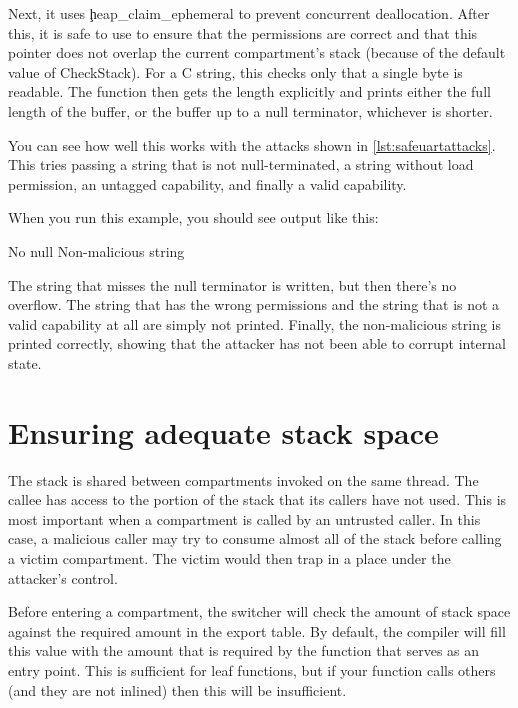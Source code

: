 \codelisting[marker=safe_uart,caption=Checks to ensure that a function does not crash.,label=lst:safeuartchecks, filename=examples/check_arguments/uart.cc]{}

Next, it uses \c{heap_claim_ephemeral} to prevent concurrent deallocation.
After this, it is safe to use  to ensure that the permissions are correct and that this pointer does not overlap the current compartment's stack (because of the default value of CheckStack).
For a C string, this checks only that a single byte is readable.
The function then gets the length explicitly and prints either the full length of the buffer, or the buffer up to a null terminator, whichever is shorter.


You can see how well this works with the attacks shown in \ref{lst:safeuartattacks}.
This tries passing a string that is not null-terminated, a string without load permission, an untagged capability, and finally a valid capability.

\codelisting[marker=attacks,caption=Attempting to attack the safe UART.,label=lst:safeuartattacks, filename=examples/check_arguments/hello.cc]{}

When you run this example, you should see output like this:

\begin{console}
No null
Non-malicious string
\end{console}

The string that misses the null terminator is written, but then there's no overflow.
The string that has the wrong permissions and the string that is not a valid capability at all are simply not printed.
Finally, the non-malicious string is printed correctly, showing that the attacker has not been able to corrupt internal state.

\section{Ensuring adequate stack space}

The stack is shared between compartments invoked on the same thread.
The callee has access to the portion of the stack that its callers have not used.
This is most important when a compartment is called by an untrusted caller.
In this case, a malicious caller may try to consume almost all of the stack before calling a victim compartment.
The victim would then trap in a place under the attacker's control.

Before entering a compartment, the switcher will check the amount of stack space against the required amount in the export table.
By default, the compiler will fill this value with the amount that is required by the function that serves as an entry point.
This is sufficient for leaf functions, but if your function calls others (and they are not inlined) then this will be insufficient.

